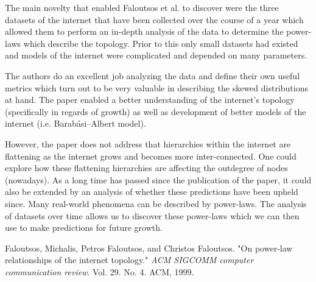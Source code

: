 \documentclass[12pt]{article}
\begin{document}
The main novelty that enabled Faloutsos et al. to discover were the three datasets of the internet that have been collected over the course of a year which allowed them to perform an in-depth analysis of the data to determine the power-laws which describe the topology. Prior to this only small datasets had existed and models of the internet were complicated and depended on many parameters.

The authors do an excellent job analyzing the data and define their own useful metrics which turn out to be very valuable in describing the skewed distributions at hand. The paper enabled a better understanding of the internet's topology (specifically in regards of growth) as well as development of better models of the internet (i.e. Barabási–Albert model). 

However, the paper does not address that hierarchies within the internet are flattening as the internet grows and becomes more inter-connected. One could explore how these flattening hierarchies are affecting the outdegree of nodes (nowadays). As a long time has passed since the publication of the paper, it could also be extended by an analysis of whether these predictions have been upheld since. Many real-world phenomena can be described by power-laws. The analysis of datasets over time allows us to discover these power-laws which we can then use to make predictions for future growth.



\begingroup
\renewcommand{\section}[2]{}%
\begin{thebibliography}{9}
Faloutsos, Michalis, Petros Faloutsos, and Christos Faloutsos. "On power-law relationships of the internet topology." \emph{ACM SIGCOMM computer communication review}. Vol. 29. No. 4. ACM, 1999.
\end{thebibliography}
\endgroup
 
\end{document}
